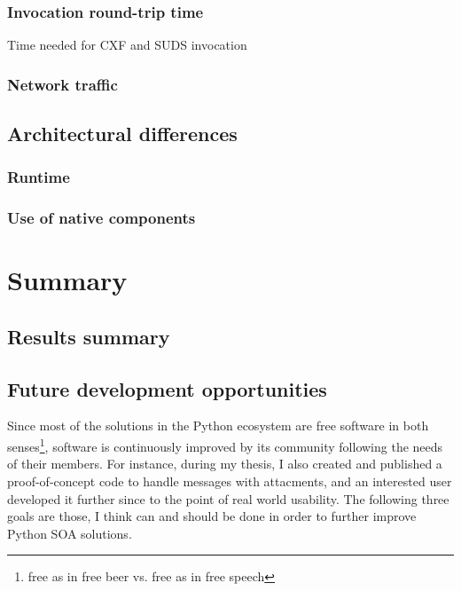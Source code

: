 \subsection{Invocation round-trip time}

\begin{table}[htbp]
 \begin{center}
  
  \caption{Time needed for CXF and SUDS invocation}
  \label{tab:stat_invoke}
 \end{center}
\end{table}

\subsection{Network traffic}


\section{Architectural differences}

\subsection{Runtime}


\subsection{Use of native components}


\chapter{Summary}

\section{Results summary}

\section{Future development opportunities}

Since most of the solutions in the Python ecosystem are free software in both senses\footnote{free as in free beer vs. free as in free speech}, software is continuously improved by its community following the needs of their members. For instance, during my thesis, I also created and published a proof-of-concept code to handle messages with attacments, and an interested user developed it further since to the point of real world usability. The following three goals are those, I think can and should be done in order to further improve Python SOA solutions.

